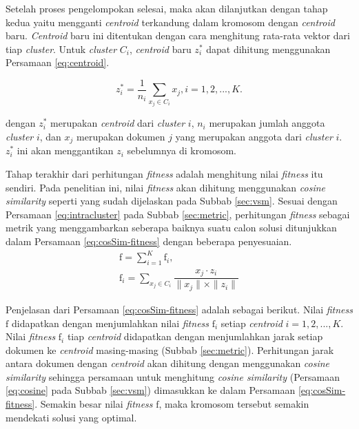 Setelah proses pengelompokan selesai, maka akan dilanjutkan dengan tahap kedua yaitu mengganti \textit{centroid} terkandung dalam kromosom dengan \textit{centroid} baru. \textit{Centroid} baru ini ditentukan dengan cara menghitung rata-rata vektor dari tiap \textit{cluster}. Untuk \textit{cluster} $C_i$, \textit{centroid} baru $z_i^*$ dapat dihitung menggunakan Persamaan \ref{eq:centroid}.

\begin{equation}
\label{eq:centroid}
z_i^*=\frac{1}{n_i} \sum_{x_j\in C_i} x_j,   i=1,2, ... ,K.
\end{equation}

dengan $z_i^*$ merupakan \textit{centroid} dari \textit{cluster} $i$, $n_i$ merupakan jumlah anggota \textit{cluster} $i$, dan $x_j$ merupakan dokumen $j$ yang merupakan anggota dari \textit{cluster} $i$. $z_i^*$ ini akan menggantikan $z_i$ sebelumnya di kromosom. 

Tahap terakhir dari perhitungan \textit{fitness} adalah menghitung nilai \textit{fitness} itu sendiri. Pada penelitian ini, nilai \textit{fitness} akan dihitung menggunakan \textit{cosine similarity} seperti yang sudah dijelaskan pada Subbab \ref{sec:vsm}. Sesuai dengan Persamaan \ref{eq:intracluster} pada Subbab \ref{sec:metric}, perhitungan \textit{fitness} sebagai metrik yang menggambarkan seberapa baiknya suatu calon solusi ditunjukkan dalam Persamaan \ref{eq:cosSim-fitness} dengan beberapa penyesuaian.
\begin{equation}
\label{eq:cosSim-fitness}
	\begin{gathered}
	\textrm{f}=\sum_{i=1}^K \textrm{f}_i , \\
	\textrm{f}_i=\sum_{x_j\in C_i}\dfrac{x_j\cdot z_i}{\parallel x_j \parallel \times \parallel z_i \parallel}
	\end{gathered}
\end{equation}

Penjelasan dari Persamaan \ref{eq:cosSim-fitness} adalah sebagai berikut. Nilai \textit{fitness} $\textrm{f}$ didapatkan dengan menjumlahkan nilai \textit{fitness} $\textrm{f}_i$ setiap \textit{centroid} $i=1, 2, ..., K$. Nilai \textit{fitness} $\textrm{f}_i$ tiap \textit{centroid} didapatkan dengan menjumlahkan jarak setiap dokumen ke \textit{centroid} masing-masing (Subbab \ref{sec:metric}). Perhitungan jarak antara dokumen dengan \textit{centroid} akan dihitung dengan menggunakan \textit{cosine similarity} sehingga persamaan untuk menghitung \textit{cosine similarity} (Persamaan \ref{eq:cosine} pada Subbab \ref{sec:vsm}) dimasukkan ke dalam Persamaan \ref{eq:cosSim-fitness}. Semakin besar nilai \textit{fitness} $\textrm{f}$, maka kromosom tersebut semakin mendekati solusi yang optimal.

